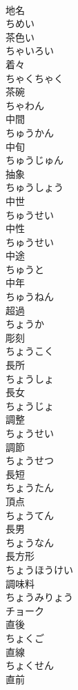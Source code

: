 \documentclass[8pt]{extreport}
\begin{document}
\begin{CJK}{UTF8}{min}
\\	地名 
\\	ちめい	
\\	茶色い 
\\	ちゃいろい	
\\	着々 
\\	ちゃくちゃく	
\\	茶碗 
\\	ちゃわん	
\\	中間 
\\	ちゅうかん	
\\	中旬 
\\	ちゅうじゅん	
\\	抽象 
\\	ちゅうしょう	
\\	中世 
\\	ちゅうせい	
\\	中性 
\\	ちゅうせい	
\\	中途 
\\	ちゅうと	
\\	中年 
\\	ちゅうねん	
\\	超過 
\\	ちょうか	
\\	彫刻 
\\	ちょうこく	
\\	長所 
\\	ちょうしょ	
\\	長女 
\\	ちょうじょ	
\\	調整 
\\	ちょうせい	
\\	調節 
\\	ちょうせつ	
\\	長短 
\\	ちょうたん	
\\	頂点 
\\	ちょうてん	
\\	長男 
\\	ちょうなん	
\\	長方形 
\\	ちょうほうけい	
\\	調味料 
\\	ちょうみりょう	
\\	チョーク	
\\	直後 
\\	ちょくご	
\\	直線 
\\	ちょくせん	
\\	直前 

\end{CJK}
\end{document}
